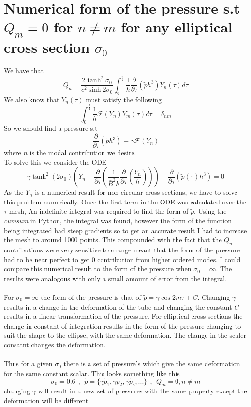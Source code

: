 \documentclass[12pt]{article}
\begin{document}
\section{Numerical form of the pressure s.t $Q_m = 0$ for $n\neq m$ for any elliptical cross section $\sigma_0$}
We have that $$Q_n=\frac{2\tanh^2\sigma_0}{c^2\sinh 2\sigma_0}\int_0^{\frac{\pi}{2}}\frac{1}{h}\frac{\partial}{\partial \tau}(\tilde{p}h^3)Y_n(\tau)d\tau$$
We also know that $Y_n(\tau)$ must satisfy the following $$\int_0^{\frac{\pi}{2}}\frac{1}{h}\mathscr{F}(Y_n)Y_m(\tau)d\tau=\delta_{nm}$$
So we should find a pressure s.t $$\frac{\partial}{\partial \tau}(\tilde{p}h^3)=\gamma\mathscr{F}(Y_n)$$ where $n$ is the modal contribution we desire. 
\\ To solve this we consider the ODE $$ \gamma\tanh^2(2\sigma_0)\left(Y_n-\frac{\partial}{\partial \tau}\left(\frac{1}{\bar{B}^2h}\frac{\partial}{\partial \tau}\left(\frac{Y_n}{h}\right)\right)\right)-\frac{\partial}{\partial \tau}(\tilde{p}(\tau)h^3)=0$$
As the $Y_n$ is a numerical result for non-circular cross-sections, we have to solve this problem numerically. Once the first term in the ODE was calculated over the $\tau$ mesh, An indefinite integral was required to find the form of $\tilde{p}$. Using the {\it{cumsum}} in Python, the integral was found, however the form of the function being integrated had steep gradients so to get an accurate result I had to increase the mesh to around 1000 points. This compounded with the fact that the $Q_n$ contributions were very sensitive to change meant that the form of the pressure had to be near perfect to get 0 contribution from higher ordered modes. I could compare this numerical result to the form of the pressure when $\sigma_0=\infty$. The results were analogous with only a small amount of error from the integral.
\\
\\ For $\sigma_0=\infty$ the form of the pressure is that of $\tilde{p}=\gamma\cos2m\tau +C$. Changing $\gamma$ results in a change in the deformation of the tube and changing the constant $C$ results in a linear transformation of the pressure. For elliptical cross-sections the change in constant of integration results in the form of the pressure changing to suit the shape to the ellipse, with the same deformation. The change in the scaler consatnt changes the deformation.
\\
\\ Thus for a given $\sigma_0$ there is a set of pressure's which give the same deformation for the same constant scalar. This looks something like this 
$$\sigma_0 = 0.6 \ \ , \ \ \tilde{p}=\{\gamma\tilde{p}_1 , \gamma\tilde{p}_2 , \gamma\tilde{p}_3 , ... \} \ \ , \ \ Q_m=0, n \neq m$$ changing $\gamma$ will result in a new set of pressures with the same property except the deformation will be different. 
\end{document}
